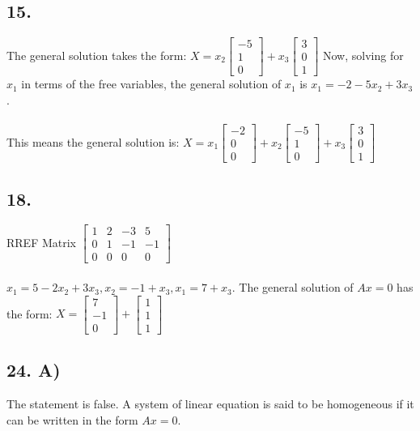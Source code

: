 \documentclass[12]{scrartcl}
\begin{document}
\subsection*{15.}
The general solution takes the form:
$X = x_2\begin{bmatrix} -5\\ 1\\  0  \end{bmatrix} + x_3\begin{bmatrix} 3\\ 0\\  1  \end{bmatrix}$
Now, solving for $x_1$ in terms of the free variables, the general solution of $x_1$ is 
$x_1 = -2-5x_2 + 3x_3$. 
\\
\\
This means the general solution is:
$X = x_1\begin{bmatrix} -2\\ 0\\  0  \end{bmatrix} + x_2\begin{bmatrix} -5\\ 1\\  0  \end{bmatrix} + x_3\begin{bmatrix} 3\\ 0\\  1  \end{bmatrix}$
\subsection*{18.}


RREF Matrix
$\begin{bmatrix} 1& 2& -3& 5 \\ 0& 1& -1& -1 \\ 0&0&0&0 \end{bmatrix}$
\\
\\
$x_1 = 5-2x_2 + 3x_3, x_2 = -1 + x_3, x_1 = 7+x_3$. The general solution of $Ax = 0$ has the form:
$X = \begin{bmatrix} 7\\ -1\\  0  \end{bmatrix} + \begin{bmatrix} 1\\ 1\\  1  \end{bmatrix}$
\subsection*{24. A)}
The statement is false. A system of linear equation is said to be homogeneous if it can be written in the form $Ax = 0$. 
\end{document}
